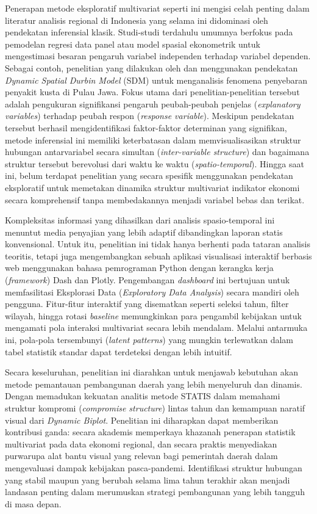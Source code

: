 \documentclass[a4paper]{article}
\theoremstyle{definition} %
\begin{document}
Penerapan metode eksploratif multivariat seperti ini mengisi celah penting dalam literatur analisis regional di Indonesia yang selama ini didominasi oleh pendekatan inferensial klasik. Studi-studi terdahulu umumnya berfokus pada pemodelan regresi data panel atau model spasial ekonometrik untuk mengestimasi besaran pengaruh variabel independen terhadap variabel dependen. Sebagai contoh, penelitian yang dilakukan oleh \citet{nuswantari2021} dan \citet{ahmad2024} menggunakan pendekatan \textit{Dynamic Spatial Durbin Model} (SDM) untuk menganalisis fenomena penyebaran penyakit kusta di Pulau Jawa. Fokus utama dari penelitian-penelitian tersebut adalah pengukuran signifikansi pengaruh peubah-peubah penjelas (\textit{explanatory variables}) terhadap peubah respon (\textit{response variable}). Meskipun pendekatan tersebut berhasil mengidentifikasi faktor-faktor determinan yang signifikan, metode inferensial ini memiliki keterbatasan dalam memvisualisasikan struktur hubungan antarvariabel secara simultan (\textit{inter-variable structure}) dan bagaimana struktur tersebut berevolusi dari waktu ke waktu (\textit{spatio-temporal}). Hingga saat ini, belum terdapat penelitian yang secara spesifik menggunakan pendekatan eksploratif untuk memetakan dinamika struktur multivariat indikator ekonomi secara komprehensif tanpa membedakannya menjadi variabel bebas dan terikat.

Kompleksitas informasi yang dihasilkan dari analisis spasio-temporal ini menuntut media penyajian yang lebih adaptif dibandingkan laporan statis konvensional. Untuk itu, penelitian ini tidak hanya berhenti pada tataran analisis teoritis, tetapi juga mengembangkan sebuah aplikasi visualisasi interaktif berbasis web menggunakan bahasa pemrograman Python dengan kerangka kerja (\textit{framework}) Dash dan Plotly. Pengembangan \textit{dashboard} ini bertujuan untuk memfasilitasi Eksplorasi Data (\textit{Exploratory Data Analysis}) secara mandiri oleh pengguna. Fitur-fitur interaktif yang disematkan seperti seleksi tahun, filter wilayah, hingga rotasi \textit{baseline} memungkinkan para pengambil kebijakan untuk mengamati pola interaksi multivariat secara lebih mendalam. Melalui antarmuka ini, pola-pola tersembunyi (\textit{latent patterns}) yang mungkin terlewatkan dalam tabel statistik standar dapat terdeteksi dengan lebih intuitif.

Secara keseluruhan, penelitian ini diarahkan untuk menjawab kebutuhan akan metode pemantauan pembangunan daerah yang lebih menyeluruh dan dinamis. Dengan memadukan kekuatan analitis metode STATIS dalam memahami struktur kompromi (\textit{compromise structure}) lintas tahun dan kemampuan naratif visual dari \textit{Dynamic Biplot}. Penelitian ini diharapkan dapat memberikan kontribusi ganda: secara akademis memperkaya khazanah penerapan statistik multivariat pada data ekonomi regional, dan secara praktis menyediakan purwarupa alat bantu visual yang relevan bagi pemerintah daerah dalam mengevaluasi dampak kebijakan pasca-pandemi. Identifikasi struktur hubungan yang stabil maupun yang berubah selama lima tahun terakhir akan menjadi landasan penting dalam merumuskan strategi pembangunan yang lebih tangguh di masa depan.
\end{document}
